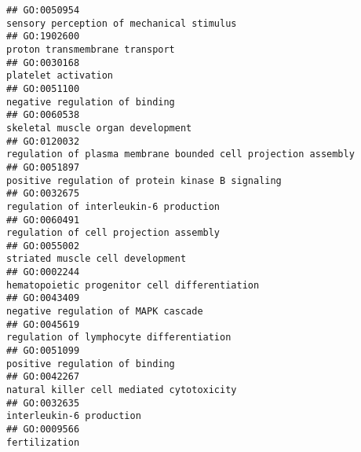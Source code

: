 \documentclass[
]{article}
\begin{document}
\begin{verbatim}
## GO:0050954                                                                                                        sensory perception of mechanical stimulus
## GO:1902600                                                                                                                   proton transmembrane transport
## GO:0030168                                                                                                                              platelet activation
## GO:0051100                                                                                                                   negative regulation of binding
## GO:0060538                                                                                                                skeletal muscle organ development
## GO:0120032                                                                                   regulation of plasma membrane bounded cell projection assembly
## GO:0051897                                                                                                positive regulation of protein kinase B signaling
## GO:0032675                                                                                                           regulation of interleukin-6 production
## GO:0060491                                                                                                           regulation of cell projection assembly
## GO:0055002                                                                                                                 striated muscle cell development
## GO:0002244                                                                                                    hematopoietic progenitor cell differentiation
## GO:0043409                                                                                                              negative regulation of MAPK cascade
## GO:0045619                                                                                                         regulation of lymphocyte differentiation
## GO:0051099                                                                                                                   positive regulation of binding
## GO:0042267                                                                                                        natural killer cell mediated cytotoxicity
## GO:0032635                                                                                                                         interleukin-6 production
## GO:0009566                                                                                                                                    fertilization

\end{verbatim}
\end{document}
